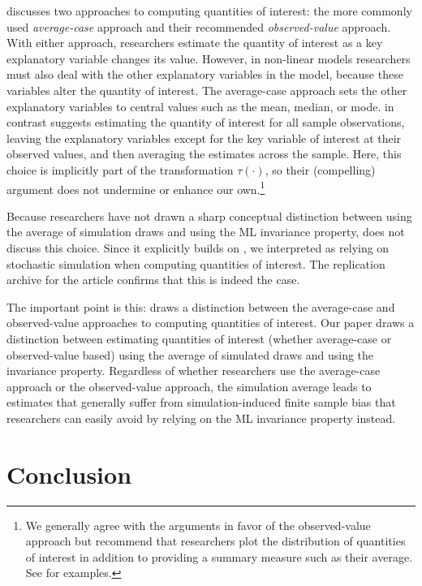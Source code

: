 \documentclass[11pt]{article}
\begin{document}
\cite{HanmerKalkan2013} discusses two approaches to computing quantities of interest: the more commonly used {\it average-case} approach and their recommended {\it observed-value} approach. With either approach, researchers estimate the quantity of interest as a key explanatory variable changes its value. However, in non-linear models researchers must also deal with the other explanatory variables in the model, because these variables alter the quantity of interest. The average-case approach sets the other explanatory variables to central values such as the mean, median, or mode. \cite{HanmerKalkan2013} in contrast suggests estimating the quantity of interest for all sample observations, leaving the explanatory variables except for the key variable of interest at their observed values, and then averaging the estimates across the sample. Here, this choice is implicitly part of the transformation $\tau(\cdot)$, so their (compelling) argument does not undermine or enhance our own.\footnote{We generally agree with the arguments in favor of the observed-value approach but recommend that researchers plot the distribution of quantities of interest in addition to providing a summary measure such as their average. See \cite{AiNorton2003} for examples.}


Because researchers have not drawn a sharp conceptual distinction between using the average of simulation draws and using the ML invariance property, \cite{HanmerKalkan2013} does not discuss this choice.
Since it explicitly builds on \cite{KingTomzWittenberg2000}, we interpreted \cite{HanmerKalkan2013} as relying on stochastic simulation when computing quantities of interest. The replication archive for the article confirms that this is indeed the case.

The important point is this: \cite{HanmerKalkan2013} draws a distinction between the average-case and observed-value approaches to computing
quantities of interest.
Our paper draws a distinction between estimating quantities of interest (whether average-case or observed-value based) using the average of simulated draws and using the invariance property.
Regardless of whether researchers use the average-case approach or the observed-value approach, the simulation average leads to estimates that generally suffer from simulation-induced finite sample bias that researchers can easily avoid by relying on the ML invariance property instead.



\section*{Conclusion}
\end{document}
